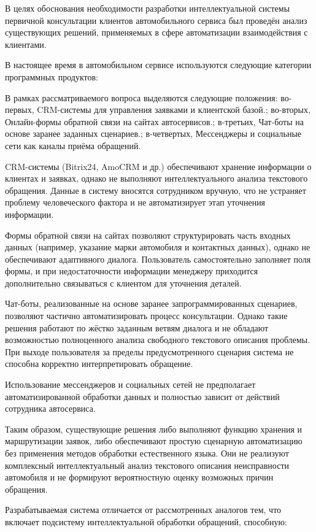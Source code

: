 \documentclass[14pt,a4paper]{extarticle}
\numberwithin{figure}{section}
\numberwithin{table}{section}
\begin{document}
В целях обоснования необходимости разработки интеллектуальной системы
первичной консультации клиентов автомобильного сервиса был проведён
анализ существующих решений, применяемых в сфере автоматизации
взаимодействия с клиентами.

В настоящее время в автомобильном сервисе используются следующие
категории программных продуктов:


В рамках рассматриваемого вопроса выделяются следующие положения: во-первых, CRM-системы для управления заявками и клиентской базой.; во-вторых, Онлайн-формы обратной связи на сайтах автосервисов.; в-третьих, Чат-боты на основе заранее заданных сценариев.; в-четвертых, Мессенджеры и социальные сети как каналы приёма обращений.


CRM-системы (Bitrix24, AmoCRM и др.) обеспечивают хранение информации о
клиентах и заявках, однако не выполняют интеллектуального анализа
текстового обращения. Данные в систему вносятся сотрудником вручную, что
не устраняет проблему человеческого фактора и не автоматизирует этап
уточнения информации.

Формы обратной связи на сайтах позволяют структурировать часть входных
данных (например, указание марки автомобиля и контактных данных), однако
не обеспечивают адаптивного диалога. Пользователь самостоятельно
заполняет поля формы, и при недостаточности информации менеджеру
приходится дополнительно связываться с клиентом для уточнения деталей.

Чат-боты, реализованные на основе заранее запрограммированных сценариев,
позволяют частично автоматизировать процесс консультации. Однако такие
решения работают по жёстко заданным ветвям диалога и не обладают
возможностью полноценного анализа свободного текстового описания
проблемы. При выходе пользователя за пределы предусмотренного сценария
система не способна корректно интерпретировать обращение.

Использование мессенджеров и социальных сетей не предполагает
автоматизированной обработки данных и полностью зависит от действий
сотрудника автосервиса.

Таким образом, существующие решения либо выполняют функцию хранения и
маршрутизации заявок, либо обеспечивают простую сценарную автоматизацию
без применения методов обработки естественного языка. Они не реализуют
комплексный интеллектуальный анализ текстового описания неисправности
автомобиля и не формируют вероятностную оценку возможных причин
обращения.

Разрабатываемая система отличается от рассмотренных аналогов тем, что
включает подсистему интеллектуальной обработки обращений, способную:
\end{document}
